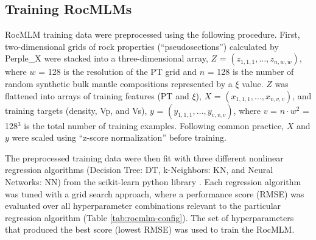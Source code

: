 \documentclass[draft,linenumbers]{agujournal2018}
\begin{document}
\subsection{Training RocMLMs}\label{sec:train-rocmlms}

RocMLM training data were preprocessed using the following procedure. First, two-dimensional grids of rock properties (``pseudosections'') calculated by Perple\_X were stacked into a three-dimensional array, \(Z\) = \((z_{1,1,1}, \ldots,z_{n,w,w})\), where \(w\) = 128 is the resolution of the PT grid and \(n\) = 128 is the number of random synthetic bulk mantle compositions represented by a \(\xi\) value. \(Z\) was flattened into arrays of training features (PT and \(\xi\)), \(X\) = \((x_{1,1,1}, \ldots, x_{v,v,v})\), and training targets (density, Vp, and Vs), \(y\) = \((y_{1,1,1}, \ldots, y_{v,v,v})\), where \(v\) = \(n \cdot w^2\) = 128\(^3\) is the total number of training examples. Following common practice, \(X\) and \(y\) were scaled using ``z-score normalization'' before training.

The preprocessed training data were then fit with three different nonlinear regression algorithms (Decision Tree: DT, k-Neighbors: KN, and Neural Networks: NN) from the scikit-learn python library \citep{scikit2011}. Each regression algorithm was tuned with a grid search approach, where a performance score (RMSE) was evaluated over all hyperparameter combinations relevant to the particular regression algorithm (Table \ref{tab:rocmlm-config}). The set of hyperparameters that produced the best score (lowest RMSE) was used to train the RocMLM.
\end{document}
